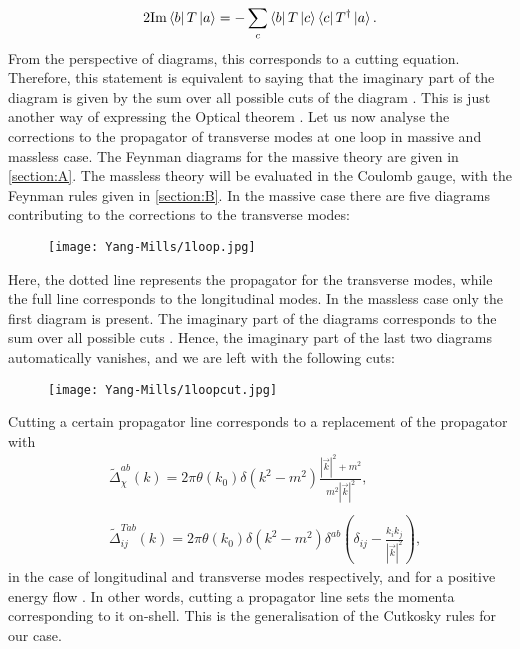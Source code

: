 \documentclass{article}
\begin{document}
\begin{equation}
    2\text{Im}\bra{b}T\ket{a}=-\sum_c\bra{b}T\ket{c}\bra{c}T^{\dag}\ket{a}.
\end{equation}
From the perspective of diagrams, this corresponds to a cutting equation. Therefore, this statement is equivalent to saying that the imaginary part of the diagram is given by the sum over all possible cuts of the diagram \cite{Diagrammar}. This is just another way of expressing the Optical theorem \cite{Peskin}.
Let us now analyse the corrections to the propagator of transverse modes at one loop in massive and massless case. The Feynman diagrams for the massive theory are given in \ref{section:A}. The massless theory will be evaluated in the Coulomb gauge, with the Feynman rules given in \ref{section:B}. 
In the massive case there are five diagrams contributing to the corrections to the transverse modes:
\begin{figure}[H]
\texttt{[image: Yang-Mills/1loop.jpg]}
\centering
\end{figure}
\vspace{-4mm}
\hfill\break Here, the dotted line represents the propagator for the transverse modes, while the full line corresponds to the longitudinal modes. 
In the massless case only the first diagram is present. The imaginary part of the diagrams corresponds to the sum over all possible cuts \cite{Diagrammar}. Hence, the imaginary part of the last two diagrams automatically vanishes, and we are left with the following cuts:
\begin{figure}[h]
\texttt{[image: Yang-Mills/1loopcut.jpg]}
\centering
\end{figure}
\vspace{-4mm}
\hfill\break
Cutting a certain propagator line corresponds to a replacement of the propagator with 
\begin{equation*}
    \begin{split}
        &\tilde{\Delta}_{\chi}^{ab}(k)=2\pi\theta(k_0)\delta(k^2-m^2)\frac{|\vec{k}|^2+m^2}{m^2|\vec{k}|^2},\\\\
        &\tilde{\Delta}^{Tab}_{ij}(k)=2\pi\theta(k_0)\delta(k^2-m^2)\delta^{ab}\left(\delta_{ij}-\frac{k_ik_j}{|\vec{k}|^2}\right),
    \end{split}
\end{equation*}
in the case of longitudinal and transverse modes respectively, 
and for a positive energy flow \cite{Diagrammar}. In other words, cutting a propagator line sets the momenta corresponding to it on-shell. This is the generalisation of the Cutkosky rules for our case. 
\end{document}

